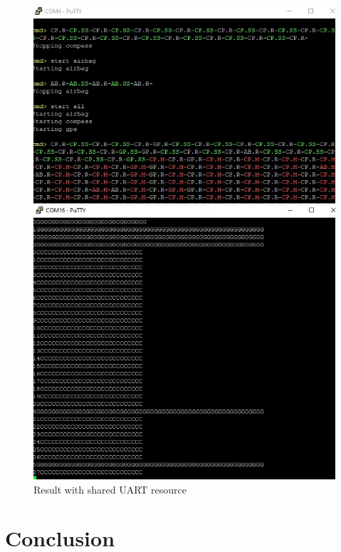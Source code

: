 \documentclass[10pt]{article}
\begin{document}
\begin{figure}[H]
\caption{Result with shared UART resource}
\label{res}
\centering
\includegraphics[width=0.7\linewidth]{./images/result.jpeg}
\end{figure}
\newpage

\section*{Conclusion}
\newpage
\end{document}
